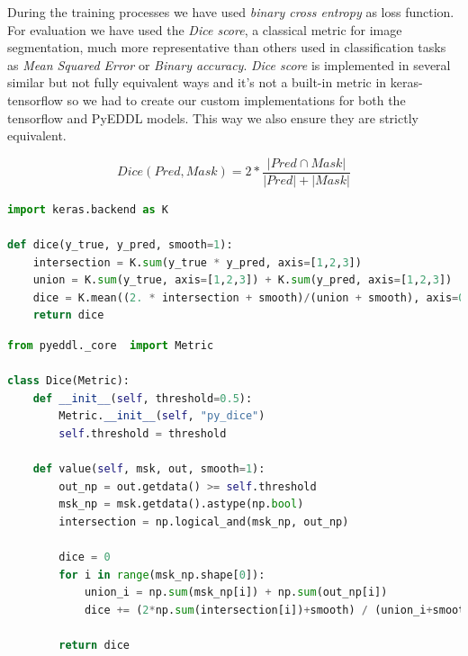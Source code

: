 During the training processes we have used \textit{binary cross entropy} as loss function. For evaluation we have used the \textit{Dice score}, a classical metric for image segmentation, much more representative than others used in classification tasks as \textit{Mean Squared Error} or \textit{Binary accuracy}. \textit{Dice score} is implemented in several similar but not fully equivalent ways and it's not a built-in metric in keras-tensorflow so we had to create our custom implementations for both the tensorflow and PyEDDL models. This way we also ensure they are strictly equivalent.

\begin{equation*}
Dice(Pred, Mask) = 2*\frac{|Pred \cap Mask |}{|Pred| + |Mask|} 
\end{equation*}
\vspace{10pt}

\begin{lstlisting}[language=Python, caption=Keras backend Dice implementation]
import keras.backend as K

def dice(y_true, y_pred, smooth=1):
    intersection = K.sum(y_true * y_pred, axis=[1,2,3])
    union = K.sum(y_true, axis=[1,2,3]) + K.sum(y_pred, axis=[1,2,3])
    dice = K.mean((2. * intersection + smooth)/(union + smooth), axis=0)
    return dice
\end{lstlisting}

\begin{lstlisting}[language=Python, caption=PyEDDL Dice implementation]
from pyeddl._core  import Metric

class Dice(Metric):
    def __init__(self, threshold=0.5):
        Metric.__init__(self, "py_dice")
        self.threshold = threshold

    def value(self, msk, out, smooth=1):   
        out_np = out.getdata() >= self.threshold
        msk_np = msk.getdata().astype(np.bool)
        intersection = np.logical_and(msk_np, out_np)
        
        dice = 0
        for i in range(msk_np.shape[0]):
            union_i = np.sum(msk_np[i]) + np.sum(out_np[i])
            dice += (2*np.sum(intersection[i])+smooth) / (union_i+smooth)

        return dice

\end{lstlisting}